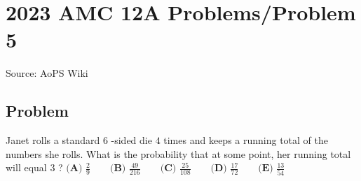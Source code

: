 \documentclass[12pt]{article}
\begin{document}
\section*{{2023 AMC 12A Problems/Problem 5}}
Source: AoPS Wiki

\subsection*{Problem}
Janet rolls a standard $6$ -sided die $4$ times and keeps a running total of the numbers she rolls. What is the probability that at some point, her running total will equal $3$ ? $\textbf{(A) }\frac{2}{9}\qquad\textbf{(B) }\frac{49}{216}\qquad\textbf{(C) }\frac{25}{108}\qquad\textbf{(D) }\frac{17}{72}\qquad\textbf{(E) }\frac{13}{54}$
\end{document}

